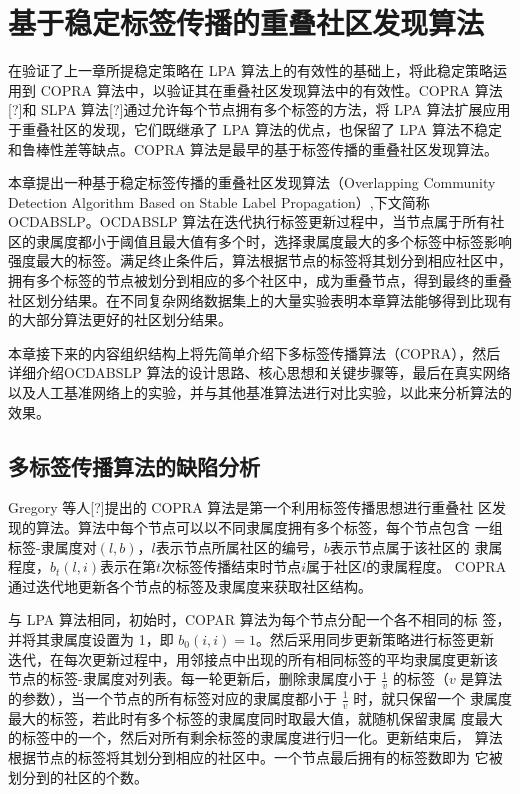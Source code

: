 \chapter{基于稳定标签传播的重叠社区发现算法}
在验证了上一章所提稳定策略在 LPA 算法上的有效性的基础上，将此稳定策略运用到 COPRA 算法中，以验证其在重叠社区发现算法中的有效性。COPRA 算法[?]和 SLPA 算法[?]通过允许每个节点拥有多个标签的方法，将 LPA 算法扩展应用于重叠社区的发现，它们既继承了 LPA 算法的优点，也保留了 LPA 算法不稳定和鲁棒性差等缺点。COPRA 算法是最早的基于标签传播的重叠社区发现算法。

本章提出一种基于稳定标签传播的重叠社区发现算法（Overlapping Community Detection Algorithm Based on Stable Label Propagation）,下文简称 OCDABSLP。OCDABSLP 算法在迭代执行标签更新过程中，当节点属于所有社区的隶属度都小于阈值且最大值有多个时，选择隶属度最大的多个标签中标签影响强度最大的标签。满足终止条件后，算法根据节点的标签将其划分到相应社区中，拥有多个标签的节点被划分到相应的多个社区中，成为重叠节点，得到最终的重叠社区划分结果。在不同复杂网络数据集上的大量实验表明本章算法能够得到比现有的大部分算法更好的社区划分结果。

本章接下来的内容组织结构上将先简单介绍下多标签传播算法（COPRA），然后详细介绍OCDABSLP 算法的设计思路、核心思想和关键步骤等，最后在真实网络以及人工基准网络上的实验，并与其他基准算法进行对比实验，以此来分析算法的效果。

\section{多标签传播算法的缺陷分析}

Gregory 等人[?]提出的 COPRA 算法是第一个利用标签传播思想进行重叠社
区发现的算法。算法中每个节点可以以不同隶属度拥有多个标签，每个节点包含
一组标签-隶属度对$(l, b)$，$l $表示节点所属社区的编号，$b $表示节点属于该社区的
隶属程度，$b_t(l, i)$表示在第$ t $次标签传播结束时节点$ i $属于社区$ l $的隶属程度。
COPRA 通过迭代地更新各个节点的标签及隶属度来获取社区结构。

与 LPA 算法相同，初始时，COPAR 算法为每个节点分配一个各不相同的标
签，并将其隶属度设置为 1，即 $b_0(i, i) = 1$。然后采用同步更新策略进行标签更新
迭代，在每次更新过程中，用邻接点中出现的所有相同标签的平均隶属度更新该
节点的标签-隶属度对列表。每一轮更新后，删除隶属度小于 $\frac{1}{v}$ 的标签（$v$ 是算法的参数），当一个节点的所有标签对应的隶属度都小于 $\frac{1}{v}$ 时，就只保留一个
隶属度最大的标签，若此时有多个标签的隶属度同时取最大值，就随机保留隶属
度最大的标签中的一个，然后对所有剩余标签的隶属度进行归一化。更新结束后，
算法根据节点的标签将其划分到相应的社区中。一个节点最后拥有的标签数即为
它被划分到的社区的个数。 

